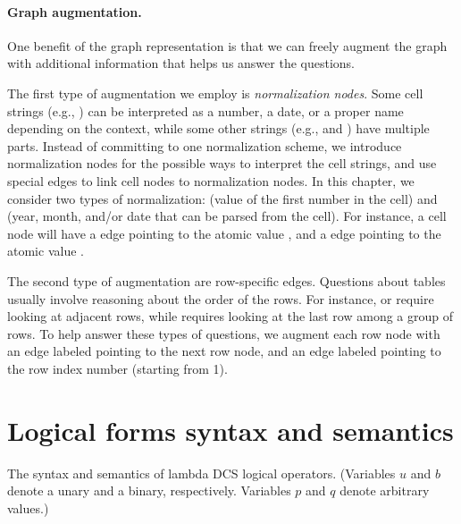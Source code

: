 \paragraph{Graph augmentation.}
One benefit of the graph representation
is that we can freely augment the graph with 
additional information that helps us answer the questions.

The first type of augmentation we employ is
\emph{normalization nodes}.
Some cell strings (e.g., )
can be interpreted as a number, a date, or a proper name
depending on the context,
while some other strings (e.g.,  and )
have multiple parts.
Instead of committing to one normalization scheme,
we introduce normalization nodes for the possible ways
to interpret the cell strings,
and use special edges to link cell nodes to normalization nodes.
In this chapter, we consider two types of normalization:
 (value of the first number in the cell)
and  (year, month, and/or date that can be parsed from the cell).
For instance, a cell node 
will have a  edge pointing to the atomic value ,
and a  edge pointing to the atomic value .

The second type of augmentation are row-specific edges.
Questions about tables usually involve reasoning about the
order of the rows. For instance,
 or 
require looking at adjacent rows,
while  requires looking
at the last row among a group of rows.
To help answer these types of questions,
we augment each row node with an edge labeled 
pointing to the next row node,
and an edge labeled  pointing to the row index number
(starting from 1).


\section{Logical forms syntax and semantics}
\label{sec:sempre-lf}

\begin{table}[!p]
\centering

\caption[The syntax and semantics of lambda DCS logical operators.]
{The syntax and semantics of lambda DCS logical operators.
(Variables $u$ and $b$ denote a unary and a binary, respectively.
Variables $p$ and $q$ denote arbitrary values.)}
\label{tab:lambda-dcs-operators}
\end{table}

